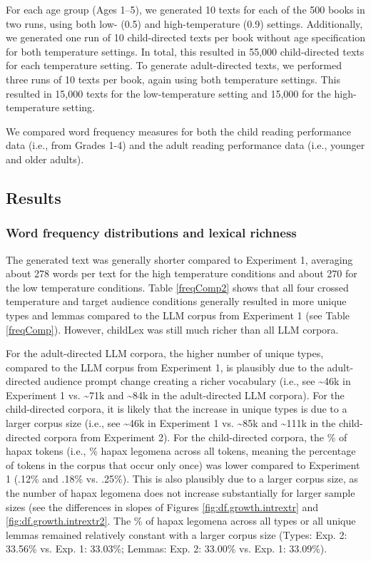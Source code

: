 \documentclass[doc, a4paper, anonymous]{apa7}
\begin{document}
For each age group (Ages 1--5), we generated 10 texts for each of the 500 books in two runs, using both low- (0.5) and high-temperature (0.9) settings. Additionally, we generated one run of 10 child-directed texts per book without age specification for both temperature settings. In total, this resulted in 55,000 child-directed texts for each temperature setting. To generate adult-directed texts, we performed three runs of 10 texts per book, again using both temperature settings. This resulted in 15,000 texts for the low-temperature setting and 15,000 for the high-temperature setting. 

We compared word frequency measures for both the child reading performance data (i.e., from Grades 1-4) and the adult reading performance data (i.e., younger and older adults). 


\subsection{Results}

\subsubsection*{Word frequency distributions and lexical richness}

The generated text was generally shorter compared to Experiment 1, averaging about 278 words per text for the high temperature conditions and about 270 for the low temperature conditions. Table \ref{freqComp2} shows that all four crossed temperature and target audience conditions generally resulted in more unique types and lemmas compared to the LLM corpus from Experiment 1 (see Table \ref{freqComp}). However, childLex was still much richer than all LLM corpora. 

For the adult-directed LLM corpora, the higher number of unique types, compared to the LLM corpus from Experiment 1, is plausibly due to the adult-directed audience prompt change creating a richer vocabulary (i.e., see \textasciitilde 46k in Experiment 1 vs. \textasciitilde 71k and \textasciitilde 84k in the adult-directed LLM corpora). For the child-directed corpora, it is likely that the increase in unique types is due to a larger corpus size (i.e., see \textasciitilde 46k in Experiment 1 vs. \textasciitilde 85k and \textasciitilde 111k in the child-directed corpora from Experiment 2). For the child-directed corpora, the \% of hapax tokens (i.e., \% hapax legomena across all tokens, meaning the percentage of tokens in the corpus that occur only once) was lower compared to Experiment 1 (.12\% and .18\% vs. .25\%). This is also plausibly due to a larger corpus size, as the number of hapax legomena does not increase substantially for larger sample sizes (see the differences in slopes of Figures \ref{fig:df.growth.intrextr} and \ref{fig:df.growth.intrextr2}. The \% of hapax legomena across all types or all unique lemmas remained relatively constant with a larger corpus size (Types: Exp. 2: 33.56\% vs. Exp. 1: 33.03\%; Lemmas: Exp. 2: 33.00\% vs. Exp. 1: 33.09\%). 
\end{document}
